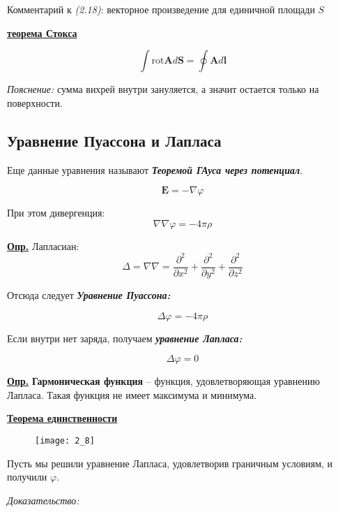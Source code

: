 Комментарий к \textit{(2.18)}: векторное произведение для единичной площади $S$

\colorbox{faded}{\underline{\textbf{теорема Стокса}}}

\begin{equation}
\int \mathrm{rot} \mathbf{A} d \mathbf{S} = \oint \mathbf{A} d \mathbf{l}
\end{equation}

\textit{Пояснение:} сумма вихрей внутри зануляется, а значит остается только на поверхности.

\subsection{Уравнение Пуассона и Лапласа}
Еще данные уравнения называют \textit{\textbf{Теоремой ГАуса через потенциал}}.

$$\mathbf{E} = - \nabla \varphi$$

При этом дивергенция:
$$\nabla \nabla \varphi = - 4 \pi \rho$$

\colorbox{faded}{\underline{\textbf{Опр.}}} Лапласиан:
 $$\Delta = \nabla \nabla = \frac{\partial ^2}{\partial x^{2}} + \frac{\partial ^2}{\partial y^{2}}  + \frac{\partial ^2}{\partial z^{2}} $$

Отсюда следует \textbf{\textit{Уравнение Пуассона:}}

\begin{equation}
\Delta \varphi = - 4 \pi \rho
\end{equation}

Если  внутри нет заряда, получаем \textit{\textbf{уравнение Лапласа:}}

\begin{equation}
\Delta \varphi = 0
\end{equation}

\colorbox{faded}{\underline{\textbf{Опр.}}} \textbf{Гармоническая функция} -- функция, удовлетворяющая уравнению Лапласа. Такая функция не имеет максимума и минимума. 

\colorbox{faded}{\underline{\textbf{Теорема единственности}}} 

\begin{figure}[!ht]
\centering
 \texttt{[image: 2\_8]}     
 \label{fig:my_label}
 \caption{}
\end{figure}

Пусть мы решили уравнение Лапласа, удовлетворив граничным условиям, и получили $\varphi$.

\textit{Доказательство:}

